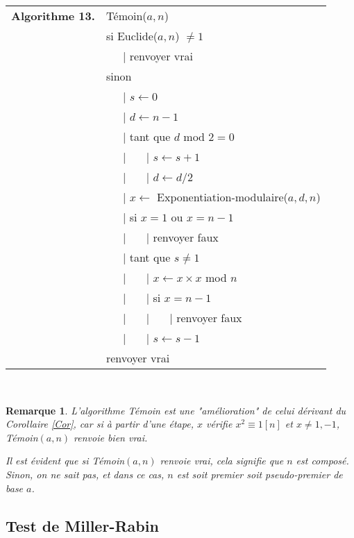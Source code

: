 \documentclass[12pt]{report}
\newtheorem*{rem}{Remarque}
\begin{document}
\begin{tabular}{ll}
\textbf{Algorithme 13.} & Témoin($a,n$)\\
           & si Euclide($a,n$) $\neq 1$ \\
           & \ \ \ {\rm |}  renvoyer vrai \\
           & sinon \\
           & \ \ \ {\rm |} $s \leftarrow 0$ \\
           & \ \ \ {\rm |} $d \leftarrow n-1$ \\
           &  \ \ \ {\rm |} tant que $d$ mod $2=0$   \\
           & \ \ \ {\rm |} \ \ \ {\rm |} $s \leftarrow s+1 $\\
           & \ \ \ {\rm |} \ \ \ {\rm |} $d \leftarrow d/2$ \\
           & \ \ \ {\rm |} $x\leftarrow$ Exponentiation-modulaire($a,d,n$) \\           
           &  \ \ \ {\rm |} si $x=1$ ou $x=n-1$ \\
           & \ \ \ {\rm |} \ \ \ {\rm |} renvoyer faux \\
           & \ \ \ {\rm |} tant que $s \neq 1$ \\
           & \ \ \ {\rm |} \ \ \ {\rm |} $ x\leftarrow x \times x$ mod $n$ \\
           & \ \ \ {\rm |} \ \ \ {\rm |} si $x=n-1$ \\
           & \ \ \ {\rm |} \ \ \ {\rm |} \ \ \ {\rm |} renvoyer faux\\
           & \ \ \ {\rm |} \ \ \ {\rm |} $s \leftarrow s-1$ \\         
           & renvoyer vrai  
\end{tabular}\\

\begin{rem}
L'algorithme Témoin est une "amélioration" de celui dérivant du Corollaire \ref{Cor}, car si à partir d'une étape, $x$ vérifie $x^2 \equiv 1 [n]$ et $x \neq 1,-1$, Témoin$(a,n)$ renvoie bien vrai.\par 
Il est évident que si Témoin$(a,n)$ renvoie vrai, cela signifie que $n$ est composé. Sinon, on ne sait pas, et dans ce cas, $n$ est soit premier soit pseudo-premier de base $a$.
\end{rem}

\subsection*{Test de Miller-Rabin}
\end{document}
